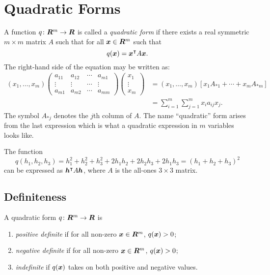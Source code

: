 \section{Quadratic Forms}

A function $q \colon \bm{R}^m \rightarrow \bm{R}$ is called a \emph{quadratic form} 
if there exists a real symmetric $m \times m$ matrix $A$ such that for all 
$\boldsymbol{x} \in \bm{R}^m$ such that
\[
	q(\boldsymbol{x}) = \boldsymbol{x}^{\intercal} A \boldsymbol{x}.
\]
The right-hand side of the equation may be written as:
\begin{align*}
(x_1, \ldots, x_m) \begin{pmatrix} 
						a_{11} & a_{12} & \cdots & a_{m 1} \\
						\vdots & \vdots & \cdots & \vdots \\
						a_{m1} & a_{m2} & \cdots & a_{mm} 	
                   \end{pmatrix} 
				   \begin{pmatrix}
						x_1 \\
						\vdots \\
						x_m
				   \end{pmatrix} & = (x_1, \ldots, x_m) [x_1 A_{* 1} + \cdots + x_m A_{* m}] \\
								 & = \sum_{i = 1}^m \sum_{j = 1}^m x_i a_{ij} x_j.
\end{align*} 
The symbol $A_{* j}$ denotes the $j$th column of $A$. The name ``quadratic'' form arises 
from the last expression which is what a quadratic expression in $m$ variables looks like.
\begin{example}
The function 
\[
	q(h_1, h_2, h_3) = h_1^2 + h_2^2 + h_3^2 + 2h_1h_2 + 2h_2h_3 + 2h_1h_3 = (h_1 + h_2 + h_3)^2
\]
can be expressed as $\boldsymbol{h}^{\intercal} A \boldsymbol{h}$, where $A$ is the all-ones $3 \times 3$ matrix. 
\end{example}

\subsection{Definiteness}
A quadratic form $q \colon \bm{R}^m \rightarrow \bm{R}$ is 
\begin{enumerate}
	\item \emph{positive definite} if for all non-zero $\boldsymbol{x} \in \bm{R}^m$, $q(\boldsymbol{x}) > 0$;
	\item \emph{negative definite} if for all non-zero $\boldsymbol{x} \in \bm{R}^m$, $q(\boldsymbol{x}) > 0$;
	\item \emph{indefinite} if $q(\boldsymbol{x})$ takes on both positive and negative values.  
\end{enumerate}

